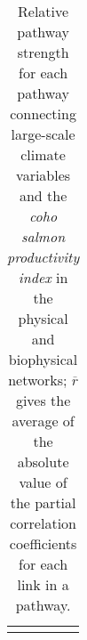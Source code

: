 
{\small
  \libertineLF
  \begin{longtable}{lll}
    \caption[Relative pathway strength for each pathway connecting large-scale
      climate variables and the coho salmon productivity index.]{Relative
      pathway strength for each pathway connecting large-scale climate variables
      and the \emph{coho salmon productivity index} in the physical and
      biophysical networks; $\overline{r}$ gives the average of the absolute
      value of the partial correlation coefficients for each link in a pathway.} \\ 
    \hline
    
    \hline
    \label{tab:bn:s1}
  \end{longtable}
}
